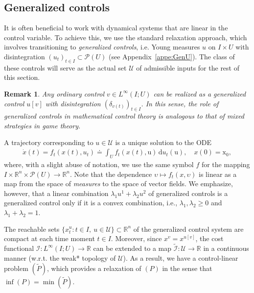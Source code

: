 \documentclass[sn-mathphys-num]{sn-jnl}
\numberwithin{equation}{section}
\theoremstyle{mythm}
\theoremstyle{mydef}
\newtheorem{remark}[proposition]{Remark}
\begin{document}
\subsection{Generalized controls}

It is often beneficial to work with dynamical systems that are linear in the control variable. To achieve this, we use the standard relaxation approach, which involves transitioning to \emph{generalized controls}, i.e. Young measures $u$ on $I \times U$ with disintegration \( (u_t)_{t \in I} \subset \mathcal P(U) \)  (see Appendix~\ref{appe:GenU}). The class of these controls will serve as the actual set $\mathcal{U}$ of admissible inputs for the rest of this section.

\begin{remark}
    
    Any ordinary control \( v \in L^\infty(I;U) \) can be realized as a generalized control \( u[v] \) with disintegration \( (\delta_{v(t)})_{t \in I} \). In this sense, the role of generalized controls in mathematical control theory is analogous to that of mixed strategies in game theory. 
\end{remark}

A trajectory corresponding to \( u \in \mathcal U \) is a unique solution to the ODE
\begin{align}\label{Rlode}
\dot{x}(t) = f_t\left(x(t),u_t\right) \doteq \int_U f_t(x(t),\mathrm{u}) \, \mathrm{d} u_t(\mathrm{u}), \quad {x}(0) = \mathrm{x}_0,
\end{align}
where, with a slight abuse of notation, we use the same symbol \( f \) for the mapping \( I \times \mathbb{R}^n \times \mathcal{P}(U) \to \mathbb{R}^n \). Note that the dependence \(\upsilon \mapsto f_t(x,\upsilon) \) is linear as a map from the space of \emph{measures} to the space of vector fields. We emphasize, however, that a linear combination \( \lambda_1 u^1 + \lambda_2 u^2 \) of generalized controls is a generalized control only if it is a convex combination, i.e., \( \lambda_1, \lambda_2 \geq 0 \) and \( \lambda_1 + \lambda_2 = 1 \). 


The reachable sets \( \{x_t^{u} \colon t \in I, \ u \in \mathcal{U}\} \subset \mathbb{R}^n \) of the generalized control system are compact at each time moment \( t \in I \). Moreover, since $x^v = x^{u[v]}$, the cost functional $\mathcal{I} \colon L^\infty(I;U) \to \mathbb{R}$ can be extended to a map $\widetilde{\mathcal{I}} \colon \mathcal{U} \to \mathbb{R}$ in a continuous manner (w.r.t. the weak* topology of $\mathcal{U}$). As a result, we have a {control-linear} problem $(\widetilde{P})$, which provides a relaxation of $(P)$ in the sense that $\inf (P) = \min(\widetilde{P})$. 
\end{document}
